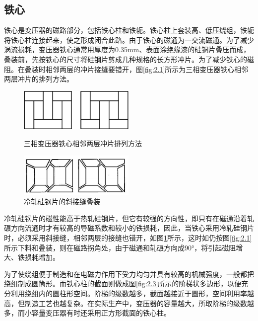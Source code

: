 \documentclass{book}
\begin{document}
\subsection{铁心}
铁心是变压器的磁路部分，包括铁心柱和铁轭。铁心柱上套装高、低压绕组，铁轭将铁心柱连接起来，使之形成闭合此路。由于铁心的磁通为一交流磁通。为了减少涡流损耗，变压器铁心通常用厚度为0.35mm、表面涂绝缘漆的硅铜片叠压而成，叠装前，先按铁心的尺寸将硅钢片剪成几种规格的长方形冲片。为了减少铁心的磁阻。在叠装时相邻两层的冲片接缝要错开，图\ref{fig:2.1}所示为三相变压器铁心相邻两层冲片的排列方法。
\begin{figure}  %
	\begin{minipage}[H]{0.5\linewidth}  
		\centering  
		\includegraphics[width=2.2in]{2-1.png}  
		\caption{三相变压器铁心相邻两层冲片排列方法}  
		\label{fig:2.1}  
	\end{minipage}
	\begin{minipage}[H]{0.5\linewidth}  
		\centering  
		\includegraphics[width=2.2in]{2-2.png}  
		\caption{冷轧硅钢片的斜接缝叠装}  
		\label{fig:2.2}  
	\end{minipage}  
\end{figure}  
冷轧硅钢片的磁性能高于热轧硅钢片，但它有较强的方向性，即只有在磁通沿着轧碾方向流通时才有较高的导磁系数和较小的铁损耗，因此，当铁心采用冷轧硅钢片时，必须采用斜接缝，相邻两层的接缝也错开，如图\ref{fig:2.2}所示，这时如仍按图\ref{fig:2.1}所示下料和叠装，则在磁路拐角处，由于磁通和轧碾方向成90°，将引起磁阻增大、铁损耗增加。

为了使绕组便于制造和在电磁力作用下受力均匀并具有较高的机械强度，一般都把绕组制成圆筒形。而铁心柱的截面则做成图\ref{fig:2.3}所示的阶梯状多边形，以便充分利用绕组内的圆柱形空间。阶梯的级数越多，截面越接近于圆形，空间利用率越高，但制造工艺也越复杂。在实际生产中，变压器的容量越大，所取阶梯的级数越多，而小容量变压器有时还采用正方形截面的铁心柱。
\end{document}
